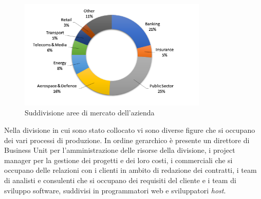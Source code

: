 	\begin{figure}[H]
	\centering
	   	\includegraphics[width=0.8\textwidth]{immagini/Mercati_Principali}
	   	\caption{Suddivisione aree di mercato dell'azienda}
	\end{figure}
	
	Nella divisione in cui sono stato collocato vi sono diverse figure che si occupano dei vari processi di produzione. In ordine gerarchico è presente un direttore di Business Unit per l'amministrazione delle risorse della divisione, i project manager per la gestione dei progetti e dei loro costi, i commerciali che si occupano delle relazioni con i clienti in ambito di redazione dei contratti, i team di analisti e consulenti che si occupano dei requisiti del cliente e i team di sviluppo software, suddivisi in programmatori web e sviluppatori \textit{host}.\\
	
	
	
